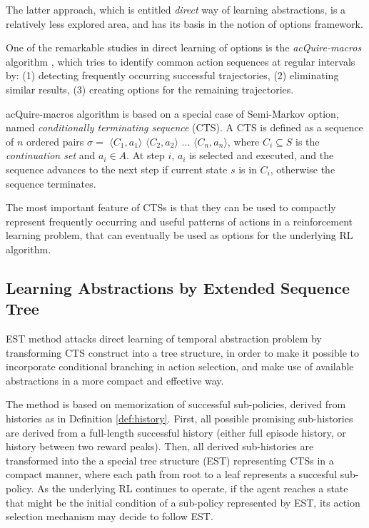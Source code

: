 \documentclass[10pt, conference, compsocconf]{IEEEtran}
\begin{document}
The latter approach, which is entitled \textit{direct} way of learning abstractions, is a relatively less explored area, and has its basis in the notion of options framework.

One of the remarkable studies in direct learning of options is the \textit{acQuire-macros} algorithm \cite{mcgovern_autonomous_2002}, which tries to identify common action sequences at regular intervals by: (1) detecting frequently occurring successful trajectories, (2) eliminating similar results, (3) creating options for the remaining trajectories. 

acQuire-macros algorithm is based on a special case of Semi-Markov option, named \textit{conditionally terminating sequence} (CTS). A CTS is defined as a sequence of $n$ ordered pairs $\sigma =$ $\langle C_1,a_1 \rangle$ $\langle C_2,a_2 \rangle$ $...$ $\langle C_n,a_n \rangle$, where $C_i \subseteq S$ is the \textit{continuation set} and $a_i \in A$. At step $i$, $a_i$ is selected and executed, and the sequence advances to the next step if current state $s$ is in $C_i$, otherwise the sequence terminates. 

The most important feature of CTSs is that they can be used to compactly represent frequently occurring and useful patterns of actions in a reinforcement learning problem, that can eventually be used as options for the underlying RL algorithm.


\subsection{Learning Abstractions by Extended Sequence Tree}
\label{sec:rl_seq}

EST method \cite{girgin_improving_2010} attacks direct learning of temporal abstraction problem by transforming CTS construct into a tree structure, in order to make it possible to incorporate conditional branching in action selection, and make use of available abstractions in a more compact and effective way.

The method is based on memorization of successful sub-policies, derived from histories as in Definition \ref{def:history}. First, all possible promising sub-histories are derived from a full-length successful history (either full episode history, or history between two reward peaks). Then, all derived sub-histories are transformed into the a special tree structure (EST) representing CTSs in a compact manner, where each path from root to a leaf represents a succesful sub-policy. As the underlying RL continues to operate, if the agent reaches a state that might be the initial condition of a sub-policy represented by EST, its action selection mechanism may decide to follow EST.
\end{document}
